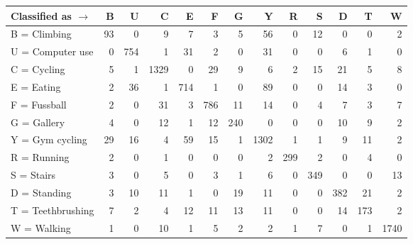 \begin{tabular}{lrrrrrrrrrrrr}
\toprule
Classified as $\rightarrow$ &   B &    U &     C &    E &    F &    G &     Y &    R &    S &    D &    T &     W \\
\midrule
B = Climbing      &  93 &    0 &     9 &    7 &    3 &    5 &    56 &    0 &   12 &    0 &    0 &     2 \\
U = Computer use  &   0 &  754 &     1 &   31 &    2 &    0 &    31 &    0 &    0 &    6 &    1 &     0 \\
C = Cycling       &   5 &    1 &  1329 &    0 &   29 &    9 &     6 &    2 &   15 &   21 &    5 &     8 \\
E = Eating        &   2 &   36 &     1 &  714 &    1 &    0 &    89 &    0 &    0 &   14 &    3 &     0 \\
F = Fussball      &   2 &    0 &    31 &    3 &  786 &   11 &    14 &    0 &    4 &    7 &    3 &     7 \\
G = Gallery       &   4 &    0 &    12 &    1 &   12 &  240 &     0 &    0 &    0 &   10 &    9 &     2 \\
Y = Gym cycling   &  29 &   16 &     4 &   59 &   15 &    1 &  1302 &    1 &    1 &    9 &   11 &     2 \\
R = Running       &   2 &    0 &     1 &    0 &    0 &    0 &     2 &  299 &    2 &    0 &    4 &     0 \\
S = Stairs        &   3 &    0 &     5 &    0 &    3 &    1 &     6 &    0 &  349 &    0 &    0 &    13 \\
D = Standing      &   3 &   10 &    11 &    1 &    0 &   19 &    11 &    0 &    0 &  382 &   21 &     2 \\
T = Teethbrushing &   7 &    2 &     4 &   12 &   11 &   13 &    11 &    0 &    0 &   14 &  173 &     2 \\
W = Walking       &   1 &    0 &    10 &    1 &    5 &    2 &     2 &    1 &    7 &    0 &    1 &  1740 \\
\bottomrule
\end{tabular}

